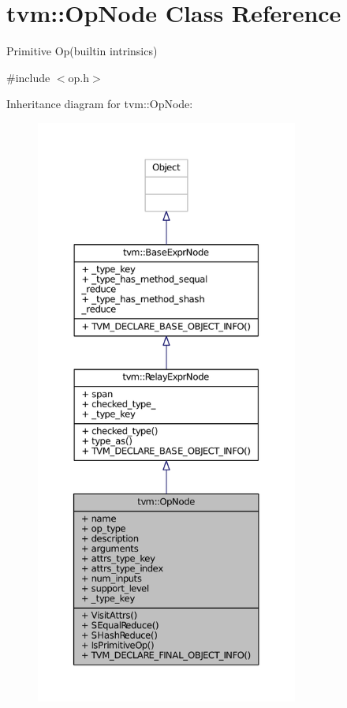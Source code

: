\hypertarget{classtvm_1_1OpNode}{}\section{tvm\+:\+:Op\+Node Class Reference}
\label{classtvm_1_1OpNode}


Primitive Op(builtin intrinsics)  




{\ttfamily \#include $<$op.\+h$>$}



Inheritance diagram for tvm\+:\+:Op\+Node\+:
\nopagebreak
\begin{figure}[H]
\begin{center}
\leavevmode
\includegraphics[height=550pt]{classtvm_1_1OpNode__inherit__graph}
\end{center}
\end{figure}


